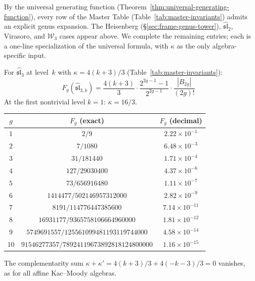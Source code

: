 By the universal generating function (Theorem~\ref{thm:universal-generating-function}), every row of the Master Table (Table~\ref{tab:master-invariants}) admits an explicit genus expansion.  The Heisenberg (\S\ref{sec:frame-genus-tower}), $\widehat{\mathfrak{sl}}_2$, Virasoro, and $\mathcal{W}_3$ cases appear above.  We complete the remaining entries; each is a one-line specialization of the universal formula, with $\kappa$ as the only algebra-specific input.

\begin{computation}\label{comp:sl3-genus-expansion}
For $\widehat{\mathfrak{sl}}_3$ at level~$k$ with $\kappa = 4(k+3)/3$ (Table~\ref{tab:master-invariants}):
\begin{equation}\label{eq:sl3-Fg}
F_g(\widehat{\mathfrak{sl}}_{3,k}) = \frac{4(k+3)}{3} \cdot \frac{2^{2g-1}-1}{2^{2g-1}} \cdot \frac{|B_{2g}|}{(2g)!}
\end{equation}
At the first nontrivial level $k = 1$: $\kappa = 16/3$.
\begin{center}
\renewcommand{\arraystretch}{1.3}
\begin{tabular}{ccc}
\toprule
$g$ & $F_g$ (exact) & $F_g$ (decimal) \\
\midrule
$1$ & $2/9$ & $2.22 \times 10^{-1}$ \\
$2$ & $7/1080$ & $6.48 \times 10^{-3}$ \\
$3$ & $31/181440$ & $1.71 \times 10^{-4}$ \\
$4$ & $127/29030400$ & $4.37 \times 10^{-6}$ \\
$5$ & $73/656916480$ & $1.11 \times 10^{-7}$ \\
$6$ & $1414477/502146957312000$ & $2.82 \times 10^{-9}$ \\
$7$ & $8191/114776447385600$ & $7.14 \times 10^{-11}$ \\
$8$ & $16931177/9365758106664960000$ & $1.81 \times 10^{-12}$ \\
$9$ & $5749691557/125561099481193119744000$ & $4.58 \times 10^{-14}$ \\
$10$ & $91546277357/78924119673892818124800000$ & $1.16 \times 10^{-15}$ \\
\bottomrule
\end{tabular}
\end{center}
The complementarity sum $\kappa + \kappa' = 4(k+3)/3 + 4(-k-3)/3 = 0$ vanishes, as for all affine Kac--Moody algebras.
\end{computation}

